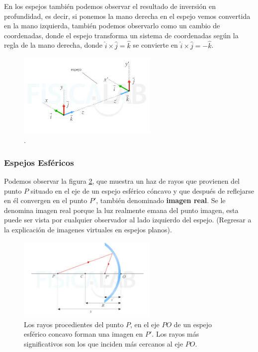 En los espejos también podemos observar el resultado de inversión en profundidad, es decir, si ponemos la mano derecha en el espejo vemos convertida en la mano izquierda, también podemos observarlo como un cambio de coordenadas, donde el espejo transforma un sistema de coordenadas según la regla de la mano derecha, donde $\hat{i} \times \hat{j} = \hat{k}$ se convierte en $\hat{i} \times \hat{j} = -\hat{k}$. 

\begin{figure}[H]
	\centering
	\includegraphics[width=0.6\textwidth]{images/inversion_profundidad.jpg}
	\caption{.}
	\label{fig:inversion_profundidad}
\end{figure}

\subsubsection*{Espejos Esféricos}

Podemos observar la figura \ref{fig:espejo_esferico}, que muestra un haz de rayos que provienen del punto $P$ situado en el eje de un espejo esférico cóncavo y  que después de reflejarse en él convergen en el punto $P'$, también denominado \textbf{imagen real}. Se le denomina imagen real porque la luz realmente emana del punto imagen, esta puede ser vista por cualquier observador al lado izquierdo del espejo. (Regresar a la explicación de imagenes virtuales en espejos planos). 

\begin{figure}[H]
	\centering
	\includegraphics[width=0.6\textwidth]{images/espejo_esferico_AV.jpg}
	\caption{Los rayos procedientes del punto $P$, en el eje $PO$ de un espejo esférico concavo forman una imagen en $P'$. Los rayos más significativos son los que inciden más cercanos al eje $PO$.}
	\label{fig:espejo_esferico}
\end{figure}

